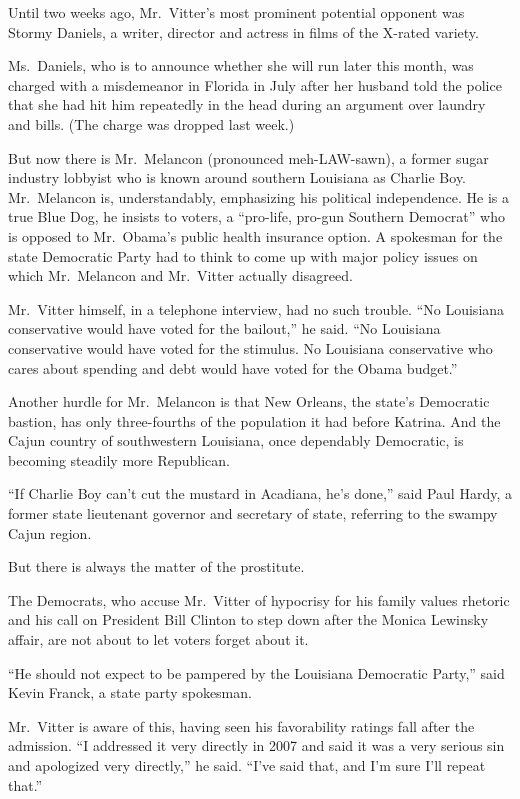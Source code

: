 ﻿\documentclass[12pt]{article}
\begin{document}
Until two weeks ago, Mr.~Vitter's most prominent potential opponent was Stormy Daniels, a writer,
director and actress in films of the X-rated variety.

Ms.~Daniels, who is to announce whether she will run later this month, was charged with a
misdemeanor in Florida in July after her husband told the police that she had hit him repeatedly in
the head during an argument over laundry and bills. (The charge was dropped last week.)

But now there is Mr.~Melancon (pronounced meh-LAW-sawn), a former sugar industry lobbyist who is
known around southern Louisiana as Charlie Boy. Mr.~Melancon is, understandably, emphasizing his
political independence. He is a true Blue Dog, he insists to voters, a ``pro-life, pro-gun Southern
Democrat'' who is opposed to Mr.~Obama's public health insurance option. A spokesman for the state
Democratic Party had to think to come up with major policy issues on which Mr.~Melancon and
Mr.~Vitter actually disagreed.

Mr.~Vitter himself, in a telephone interview, had no such trouble. ``No Louisiana conservative would
have voted for the bailout,'' he said. ``No Louisiana conservative would have voted for the
stimulus. No Louisiana conservative who cares about spending and debt would have voted for the Obama
budget.''

Another hurdle for Mr.~Melancon is that New Orleans, the state's Democratic bastion, has only
three-fourths of the population it had before Katrina. And the Cajun country of southwestern
Louisiana, once dependably Democratic, is becoming steadily more Republican.

``If Charlie Boy can't cut the mustard in Acadiana, he's done,'' said Paul Hardy, a former state
lieutenant governor and secretary of state, referring to the swampy Cajun region.

But there is always the matter of the prostitute.

The Democrats, who accuse Mr.~Vitter of hypocrisy for his family values rhetoric and his call on
President Bill Clinton to step down after the Monica Lewinsky affair, are not about to let voters
forget about it.

``He should not expect to be pampered by the Louisiana Democratic Party,'' said Kevin Franck, a
state party spokesman.

Mr.~Vitter is aware of this, having seen his favorability ratings fall after the admission. ``I
addressed it very directly in 2007 and said it was a very serious sin and apologized very
directly,'' he said. ``I've said that, and I'm sure I'll repeat that.''
\end{document}
